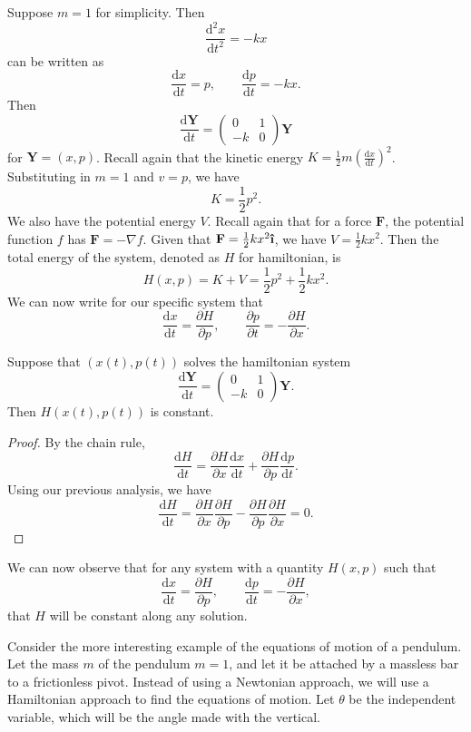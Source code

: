 Suppose $m=1$ for simplicity. Then
\[
	\frac{\mathrm{d}^2x}{\mathrm{d}t^2} =-kx
\]
can be written as
\[
	\frac{\mathrm{d}x}{\mathrm{d}t} =p,\qquad \frac{\mathrm{d}p}{\mathrm{d}t} =-kx
.\]
Then
\[
	\frac{\mathrm{d}\mathbf{Y}}{\mathrm{d}t} =\begin{pmatrix}
		0&1\\
		-k&0
	\end{pmatrix} \mathbf{Y}
\]
for $\mathbf{Y}=(x,p)$. Recall again that the kinetic energy $K=\frac{1}{2}m \left(\frac{\mathrm{d}x}{\mathrm{d}t}\right)^2 $. Substituting in $m=1$ and $v=p$, we have
\[
	K=\frac{1}{2}p^2
.\]
We also have the potential energy $V$. Recall again that for a force $\mathbf{F}$, the potential function $f$ has $\mathbf{F}=-\nabla f$. Given that $\mathbf{F}=\frac{1}{2}kx^2 \hati$, we have $V=\frac{1}{2}kx^2$. Then the total energy of the system, denoted as $H$ for hamiltonian, is
\[
	H(x,p)=K+V=\frac{1}{2}p^2+\frac{1}{2}kx^2
.\]
We can now write for our specific system that
\[
	\frac{\mathrm{d}x}{\mathrm{d}t} =\frac{\partial H}{\partial p} ,\qquad \frac{\partial p}{\partial t} =-\frac{\partial H}{\partial x} 
.\]
\begin{proposition}
	Suppose that $(x(t),p(t))$ solves the hamiltonian system
	\[
		\frac{\mathrm{d}\mathbf{Y}}{\mathrm{d}t} =\begin{pmatrix}
			0&1\\
			-k&0
		\end{pmatrix} \mathbf{Y}
	.\]
	Then $H(x(t),p\left( t \right) )$ is constant.
\end{proposition}
\begin{proof}
	By the chain rule,
	\[
		\frac{\mathrm{d}H}{\mathrm{d}t} =\frac{\partial H}{\partial x} \frac{\mathrm{d}x}{\mathrm{d}t} +\frac{\partial H}{\partial p} \frac{\mathrm{d}p}{\mathrm{d}t} 
	.\]
	Using our previous analysis, we have
	\[
		\frac{\mathrm{d}H}{\mathrm{d}t} =\frac{\partial H}{\partial x} \frac{\partial H}{\partial p} -\frac{\partial H}{\partial p} \frac{\partial H}{\partial x} =0
	.\]
\end{proof}
We can now observe that for any system with a quantity $H(x,p)$ such that
\[
	\frac{\mathrm{d}x}{\mathrm{d}t} =\frac{\partial H}{\partial p} ,\qquad \frac{\mathrm{d}p}{\mathrm{d}t} =-\frac{\partial H}{\partial x} 
,\]
that $H$ will be constant along any solution.

Consider the more interesting example of the equations of motion of a pendulum. Let the mass $m$ of the pendulum $m=1$, and let it be attached by a massless bar to a frictionless pivot. Instead of using a Newtonian approach, we will use a Hamiltonian approach to find the equations of motion. Let $\theta $ be the independent variable, which will be the angle made with the vertical.

